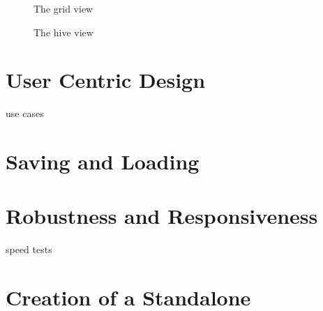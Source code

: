 \begin{figure}[ht]
\centering
\caption{The grid view}
\label{fig:grid}
\end{figure}

\begin{figure}[ht]
\centering
\caption{The hive view}
\label{fig:hive}
\end{figure}

	
\section{User Centric Design}
	use cases

\section{Saving and Loading}
\label{sec:saving_and_loading}

\section{Robustness and Responsiveness}
	speed tests

\section{Creation of a Standalone}